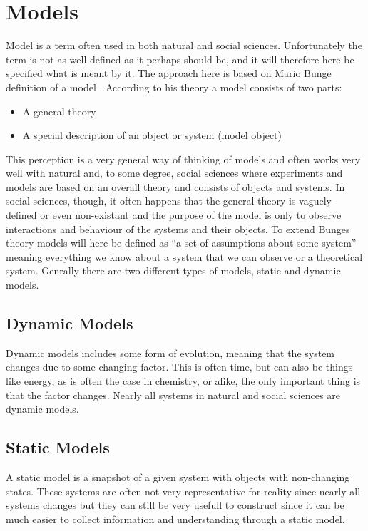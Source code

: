 \section{Models}
Model is a term often used in both natural and social sciences. Unfortunately the term is not as well defined as it perhaps should be, and it will therefore here be specified what is meant by it. The approach here is based on Mario Bunge definition of a model . According to his theory a model consists of two parts:

\begin{itemize}
\item A general theory
\item A special description of an object or system (model object)
\end{itemize}

This perception is a very general way of thinking of models and often works very well with natural and, to some degree, social sciences where experiments and models are based on an overall theory and consists of objects and systems. In social sciences, though, it often happens that the general theory is vaguely defined or even non-existant and the purpose of the model is only to observe interactions and behaviour of the systems and their objects.
To extend Bunges theory models will here be defined as \enquote{a set of assumptions about some system} meaning everything we know about a system that we can observe or a theoretical system.
Genrally there are two different types of models, static and dynamic models.


\subsection{Dynamic Models}
Dynamic models includes some form of evolution, meaning that the system changes due to some changing factor. This is often time, but can also be things like energy, as is often the case in chemistry, or alike, the only important thing is that the factor changes. Nearly all systems in natural and social sciences are dynamic models.


\subsection{Static Models}
A static model is a snapshot of a given system with objects with non-changing states. These systems are often not very representative for reality since nearly all systems changes but they can still be very usefull to construct since it can be much easier to collect information and understanding through a static model. 


